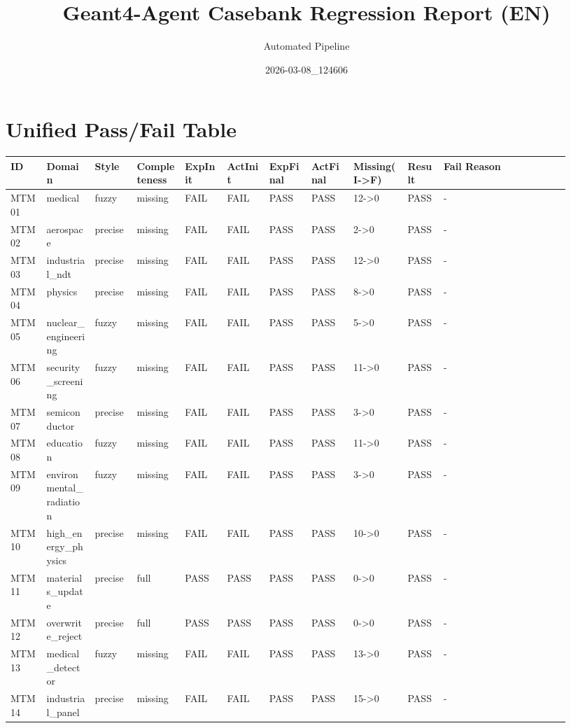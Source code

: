\documentclass[11pt]{ctexart}
\title{Geant4-Agent Casebank Regression Report (EN)}
\author{Automated Pipeline}
\date{2026-03-08\_124606}
\begin{document}
\maketitle
\section{Unified Pass/Fail Table}
\begin{longtable}{p{0.06\linewidth}p{0.08\linewidth}p{0.07\linewidth}p{0.08\linewidth}p{0.07\linewidth}p{0.07\linewidth}p{0.07\linewidth}p{0.07\linewidth}p{0.09\linewidth}p{0.06\linewidth}p{0.21\linewidth}}
\toprule
ID & Domain & Style & Completeness & ExpInit & ActInit & ExpFinal & ActFinal & Missing(I->F) & Result & Fail Reason \\
\midrule
MTM01 & medical & fuzzy & missing & FAIL & FAIL & PASS & PASS & 12->0 & PASS & - \\
MTM02 & aerospace & precise & missing & FAIL & FAIL & PASS & PASS & 2->0 & PASS & - \\
MTM03 & industrial\_ndt & precise & missing & FAIL & FAIL & PASS & PASS & 12->0 & PASS & - \\
MTM04 & physics & precise & missing & FAIL & FAIL & PASS & PASS & 8->0 & PASS & - \\
MTM05 & nuclear\_engineering & fuzzy & missing & FAIL & FAIL & PASS & PASS & 5->0 & PASS & - \\
MTM06 & security\_screening & fuzzy & missing & FAIL & FAIL & PASS & PASS & 11->0 & PASS & - \\
MTM07 & semiconductor & precise & missing & FAIL & FAIL & PASS & PASS & 3->0 & PASS & - \\
MTM08 & education & fuzzy & missing & FAIL & FAIL & PASS & PASS & 11->0 & PASS & - \\
MTM09 & environmental\_radiation & fuzzy & missing & FAIL & FAIL & PASS & PASS & 3->0 & PASS & - \\
MTM10 & high\_energy\_physics & precise & missing & FAIL & FAIL & PASS & PASS & 10->0 & PASS & - \\
MTM11 & materials\_update & precise & full & PASS & PASS & PASS & PASS & 0->0 & PASS & - \\
MTM12 & overwrite\_reject & precise & full & PASS & PASS & PASS & PASS & 0->0 & PASS & - \\
MTM13 & medical\_detector & fuzzy & missing & FAIL & FAIL & PASS & PASS & 13->0 & PASS & - \\
MTM14 & industrial\_panel & precise & missing & FAIL & FAIL & PASS & PASS & 15->0 & PASS & - \\

\end{longtable}
\end{document}
